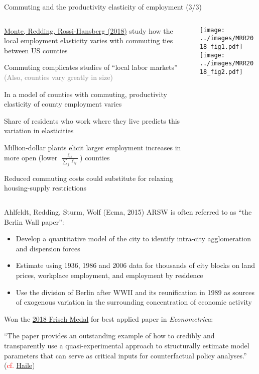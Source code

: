 \documentclass[11pt,notes=hide,aspectratio=169]{beamer}
\begin{document}
\begin{frame}{Commuting and the productivity elasticity of employment (3/3)}
\vspace{2mm}
\begin{columns}
\begin{column}{0.62\textwidth}
{\href{https://www.aeaweb.org/articles?id=10.1257/aer.20151507}{Monte, Redding, Rossi-Hansberg (2018)} study how the local employment elasticity varies with commuting ties between US counties\par}
\begin{itemize}{\small
\item Commuting complicates studies of ``local labor markets''
\textcolor{gray}{(Also, counties vary greatly in size)}
\item In a model of counties with commuting, productivity elasticity of county employment varies
\item Share of residents who work where they live predicts this variation in elasticities
\item Million-dollar plants elicit larger employment increases in more open (lower $\frac{\ell_{ii}}{\sum_{j} \ell_{ij}}$) counties
\item {Reduced commuting costs could substitute for relaxing housing-supply restrictions\par}
}\end{itemize}
\end{column}
\begin{column}{0.36\textwidth}
\texttt{[image: ../images/MRR2018\_fig1.pdf]}\\
\texttt{[image: ../images/MRR2018\_fig2.pdf]}
\end{column}
\end{columns}
\end{frame}
\begin{frame}{Ahlfeldt, Redding, Sturm, Wolf (Ecma, 2015)}
ARSW is often referred to as ``the Berlin Wall paper'':
\begin{itemize}
\item Develop a quantitative model of the city to identify intra-city agglomeration and dispersion forces
\item Estimate using 1936, 1986 and 2006 data for thousands of city blocks on land prices, workplace employment, and employment by residence
\item Use the division of Berlin after WWII and its reunification in 1989 as sources of exogenous variation in the surrounding concentration of economic activity
\end{itemize}
Won the \href{https://www.econometricsociety.org/society/awards}{2018 Frisch Medal} for best applied paper in \textit{Econometrica}:
{\small ``The paper provides an outstanding example of how to credibly and transparently use a quasi-experimental approach to structurally estimate model parameters that can serve as critical inputs for counterfactual policy analyses.''
(\textcolor{red}{cf.} \href{https://www.dropbox.com/s/8kwtwn30dyac18s/intro.pdf?dl=0}{Haile})\par}
\end{frame}
\end{document}
